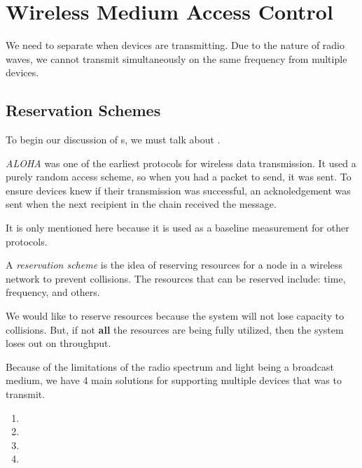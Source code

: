 \section{Wireless Medium Access Control}\label{sec:Wireless_MAC}
We need to separate when devices are transmitting.
Due to the nature of radio waves, we cannot transmit simultaneously on the same frequency from multiple devices.

\subsection{Reservation Schemes}\label{subsec:Reservation_Scheme}
To begin our discussion of s, we must talk about .

\begin{definition}[ALOHA]\label{def:ALOHA}
  \emph{ALOHA} was one of the earliest protocols for wireless data transmission.
  It used a purely random access scheme, so when you had a packet to send, it was sent.
  To ensure devices knew if their transmission was successful, an acknoledgement was sent when the next recipient in the chain received the message.

  \begin{remark}
    It is only mentioned here because it is used as a baseline measurement for other protocols.
  \end{remark}
\end{definition}

\begin{definition}\label{def:Reservation_Scheme}
  A \emph{reservation scheme} is the idea of reserving resources for a node in a wireless network to prevent collisions.
  The resources that can be reserved include: time, frequency, and others.

  We would like to reserve resources because the system will not lose capacity to collisions.
  But, if not \textbf{all} the resources are being fully utilized, then the system loses out on throughput.

  Because of the limitations of the radio spectrum and light being a broadcast medium, we have 4 main solutions for supporting multiple devices that was to transmit.
  \begin{enumerate}[noitemsep]
  \item {}
  \item {}
  \item {}
  \item {}
  \end{enumerate}
\end{definition}

